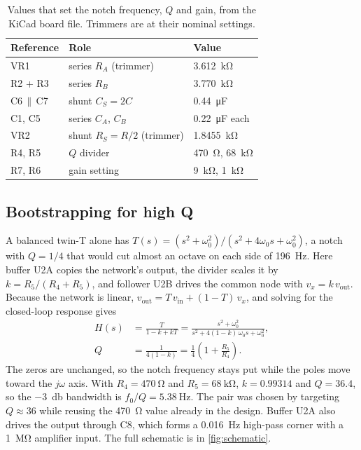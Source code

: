 \documentclass[10pt,letterpaper]{article}
\begin{document}
\begin{table}[!tb]
  \centering\small
  \begin{tabular}{C{2.4cm}C{3.6cm}C{2.4cm}}
    \toprule
    \textbf{Reference} & \textbf{Role} & \textbf{Value} \\
    \midrule
    VR1 & series $R_A$ (trimmer) & \SI{3.612}{\kilo\ohm} \\
    R2 + R3 & series $R_B$ & \SI{3.770}{\kilo\ohm} \\
    C6\,$\parallel$\,C7 & shunt $C_S = 2C$ & \SI{0.44}{\micro\farad} \\
    C1, C5 & series $C_A$, $C_B$ & \SI{0.22}{\micro\farad} each \\
    VR2 & shunt $R_S = R/2$ (trimmer) & \SI{1.8455}{\kilo\ohm} \\
    R4, R5 & $Q$ divider & \SI{470}{\ohm}, \SI{68}{\kilo\ohm} \\
    R7, R6 & gain setting & \SI{9}{\kilo\ohm}, \SI{1}{\kilo\ohm} \\
    \bottomrule
  \end{tabular}
  \caption{Values that set the notch frequency, $Q$ and gain, from the KiCad board file. Trimmers are at their nominal settings.}
  \label{tab:values}
\end{table}

\subsection{Bootstrapping for high Q}
A balanced twin-T alone has $T(s) = (s^2+\omega_0^2)/(s^2+4\omega_0 s+\omega_0^2)$, a notch with $Q = 1/4$ that would cut almost an octave on each side of \SI{196}{\hertz}. Here buffer U2A copies the network's output, the divider scales it by $k = R_5/(R_4+R_5)$, and follower U2B drives the common node with $v_x = k\,v_\text{out}$. Because the network is linear, $v_\text{out} = T\,v_\text{in} + (1-T)\,v_x$, and solving for the closed-loop response gives
\begin{align}
  H(s) &= \frac{T}{1-k+kT} = \frac{s^2+\omega_0^2}{s^2 + 4(1-k)\,\omega_0 s + \omega_0^2}, \label{eq:H}\\
  Q &= \frac{1}{4(1-k)} = \frac{1}{4}\left(1+\frac{R_5}{R_4}\right). \label{eq:Q}
\end{align}
The zeros are unchanged, so the notch frequency stays put while the poles move toward the $j\omega$ axis. With $R_4 = \SI{470}{\ohm}$ and $R_5 = \SI{68}{\kilo\ohm}$, $k = \num{0.99314}$ and $Q = \num{36.4}$, so the \SI{-3}{\decibel} bandwidth is $f_0/Q = \SI{5.38}{\hertz}$. The pair was chosen by targeting $Q \approx 36$ while reusing the \SI{470}{\ohm} value already in the design. Buffer U2A also drives the output through C8, which forms a \SI{0.016}{\hertz} high-pass corner with a \SI{1}{\mega\ohm} amplifier input. The full schematic is in \cref{fig:schematic}.
\end{document}

